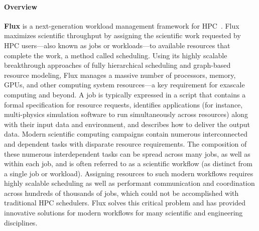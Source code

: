 \paragraph{Overview}
{\bf Flux} is a next-generation workload management
framework for HPC~\cite{flux}. Flux maximizes scientific throughput
by assigning the scientific work requested by HPC users--–also
known as jobs or workloads--–to available resources that complete
the work, a method called scheduling. Using its highly scalable
breakthrough approaches of fully hierarchical scheduling and
graph-based resource modeling, Flux manages a massive number
of processors, memory, GPUs, and other computing system
resources--–a key requirement for exascale computing and beyond. 
A job is typically expressed in a script that contains
a formal specification for resource requests, identifies
applications (for instance, multi-physics simulation software
to run simultaneously across resources) along with their
input data and environment, and describes how to deliver
the output data. Modern scientific computing campaigns
contain numerous interconnected and dependent tasks with
disparate resource requirements. The composition of these
numerous interdependent tasks can be spread across many jobs,
as well as within each job, and is often referred to as a scientific
workflow (as distinct from a single job or workload). Assigning
resources to such modern workflows requires highly scalable
scheduling as well as performant communication and coordination
across hundreds of thousands of jobs, which could not be
accomplished with traditional HPC schedulers. Flux solves this
critical problem and has provided innovative solutions
for modern workflows for many scientific and engineering
disciplines.

